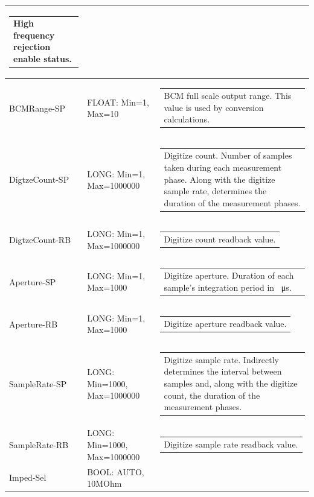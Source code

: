 \documentclass[openany]{article}
\begin{document}
\begin{longtable}{| m{3.0cm} m{4.5cm} m{7.0cm} |}
\begin{tabular}{@{}m{6cm}@{}}
	    					High frequency rejection enable status.
						\end{tabular} \\ \hline
		BCMRange-SP & FLOAT: Min=1, Max=10 & \begin{tabular}{@{}m{6cm}@{}}
	    					BCM full scale output range. This value is used by conversion calculations.
						\end{tabular} \\ \hline
		DigtzeCount-SP & LONG: Min=1, Max=1000000 & \begin{tabular}{@{}m{6cm}@{}}
	    					Digitize count. Number of samples taken during each measurement phase. Along with the digitize sample rate, determines the duration of the measurement phases.
						\end{tabular} \\ \hline
		DigtzeCount-RB & LONG: Min=1, Max=1000000 & \begin{tabular}{@{}m{6cm}@{}}
	    					Digitize count readback value.
						\end{tabular} \\ \hline
		Aperture-SP & LONG: Min=1, Max=1000 & \begin{tabular}{@{}m{6cm}@{}}
	    					Digitize aperture. Duration of each sample's integration period in \SI{}{\micro\second}.
						\end{tabular} \\ \hline
		Aperture-RB & LONG: Min=1, Max=1000 & \begin{tabular}{@{}m{6cm}@{}}
	    					Digitize aperture readback value.
						\end{tabular} \\ \hline
		SampleRate-SP & LONG: Min=1000, Max=1000000 & \begin{tabular}{@{}m{6cm}@{}}
	    					Digitize sample rate. Indirectly determines the interval between samples and, along with the digitize count, the duration of the measurement phases.
						\end{tabular} \\ \hline
		SampleRate-RB & LONG: Min=1000, Max=1000000 & \begin{tabular}{@{}m{6cm}@{}}
	    					Digitize sample rate readback value.
						\end{tabular} \\ \hline
		Imped-Sel & BOOL: AUTO, 10MOhm & \begin{tabular}{@{}m{6cm}@{}}

\end{tabular}
\end{longtable}
\end{document}
